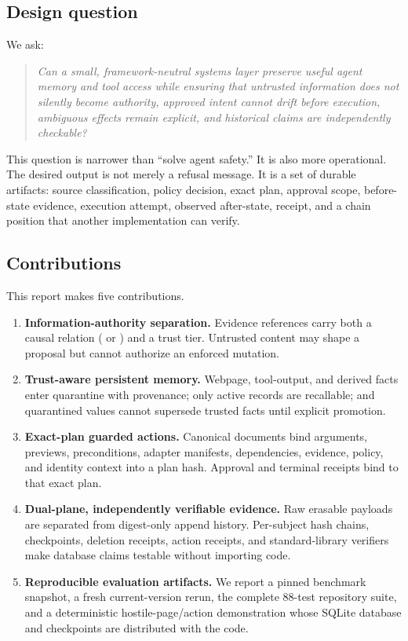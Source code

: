 \subsection{Design question}

We ask:

\begin{quote}
\emph{Can a small, framework-neutral systems layer preserve useful agent memory and tool access while ensuring that untrusted information does not silently become authority, approved intent cannot drift before execution, ambiguous effects remain explicit, and historical claims are independently checkable?}
\end{quote}

This question is narrower than ``solve agent safety.'' It is also more operational. The desired output is not merely a refusal message. It is a set of durable artifacts: source classification, policy decision, exact plan, approval scope, before-state evidence, execution attempt, observed after-state, receipt, and a chain position that another implementation can verify.

\subsection{Contributions}

This report makes five contributions.

\begin{enumerate}
  \item \textbf{Information-authority separation.} Evidence references carry both a causal relation ( or ) and a trust tier. Untrusted content may shape a proposal but cannot authorize an enforced mutation.
  \item \textbf{Trust-aware persistent memory.} Webpage, tool-output, and derived facts enter quarantine with provenance; only active records are recallable; and quarantined values cannot supersede trusted facts until explicit promotion.
  \item \textbf{Exact-plan guarded actions.} Canonical \worldpatch{} documents bind arguments, previews, preconditions, adapter manifests, dependencies, evidence, policy, and identity context into a plan hash. Approval and terminal receipts bind to that exact plan.
  \item \textbf{Dual-plane, independently verifiable evidence.} Raw erasable payloads are separated from digest-only append history. Per-subject hash chains, checkpoints, deletion receipts, action receipts, and standard-library verifiers make database claims testable without importing \system{} code.
  \item \textbf{Reproducible evaluation artifacts.} We report a pinned benchmark snapshot, a fresh current-version rerun, the complete 88-test repository suite, and a deterministic hostile-page/action demonstration whose SQLite database and checkpoints are distributed with the code.
\end{enumerate}

